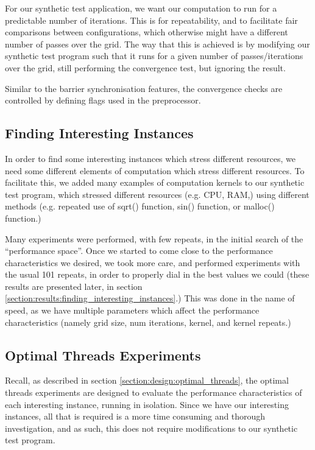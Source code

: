 For our synthetic test application, we want our computation to run for a predictable number of iterations. This is for repeatability, and to facilitate fair comparisons between configurations, which otherwise might have a different number of passes over the grid. The way that this is achieved is by modifying our synthetic test program such that it runs for a given number of passes/iterations over the grid, still performing the convergence test, but ignoring the result.

Similar to the barrier synchronisation features, the convergence checks are controlled by defining flags used in the preprocessor.



\subsection{Finding Interesting Instances}
\label{section:experimental_methodology:finding_interesting_instances}

In order to find some interesting instances which stress different resources, we need some different elements of computation which stress different resources. To facilitate this, we added many examples of computation kernels to our synthetic test program, which stressed different resources (e.g. CPU, RAM,) using different methods (e.g. repeated use of sqrt() function, sin() function, or malloc() function.)

Many experiments were performed, with few repeats, in the initial search of the ``performance space''. Once we started to come close to the performance characteristics we desired, we took more care, and performed experiments with the usual 101 repeats, in order to properly dial in the best values we could (these results are presented later, in section \ref{section:results:finding_interesting_instances}.) This was done in the name of speed, as we have multiple parameters which affect the performance characteristics (namely grid size, num iterations, kernel, and kernel repeats.)



\subsection{Optimal Threads Experiments}
\label{section:experimental_methodology:optimal_threads_experiments}

Recall, as described in section \ref{section:design:optimal_threads}, the optimal threads experiments are designed to evaluate the performance characteristics of each interesting instance, running in isolation. Since we have our interesting instances, all that is required is a more time consuming and thorough investigation, and as such, this does not require modifications to our synthetic test program. 

